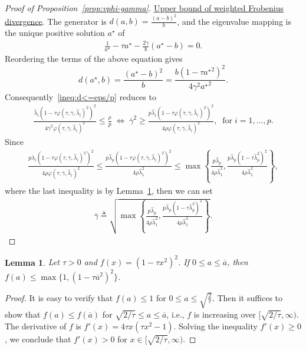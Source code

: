 \documentclass[11pt]{article}
\newtheorem{lemma}{Lemma}
\newcommand{\opt}{^\star}
\newcommand{\Let}{\triangleq}
\newcommand{\wh}{\widehat}
\begin{document}
\begin{proof}[Proof of Proposition~\ref{prop:vphi-gamma}]
    \underline{Upper bound of weighted Frobenius divergence}. The generator is $d(a,b)=\frac{(a-b)^2}{b}$, and the eigenvalue mapping is the unique positive solution $a\opt$ of 
    \begin{align*}
        \frac{1}{a\opt}-\tau a\opt - \frac{2\gamma}{b}(a\opt-b) = 0.
    \end{align*}
    Reordering the terms of the above equation gives
    \[
        d(a\opt,b)=\frac{(a\opt-b)^2}{b} = \frac{b(1-\tau {a\opt}^2)^2}{4\gamma^2{a\opt}^2}.
    \]
    Consequently~\eqref{ineq:d<=eps/p} reduces to
    \begin{align*}
        \frac{\wh\lambda_i(1-\tau \varphi(\tau,\overline{\gamma},\wh\lambda_i)^2)^2}{4\overline{\gamma}^2\varphi(\tau,\overline{\gamma},\wh\lambda_i)^2}
        \leq \frac{ \rho}{p}
        \;\Longleftrightarrow\;
        \overline{\gamma}^2\geq \frac{p\wh\lambda_i(1-\tau \varphi(\tau,\overline{\gamma},\wh\lambda_i)^2)^2}{4 \rho\varphi(\tau,\overline{\gamma},\wh\lambda_i)^2}
        ,\;\; \text{for}\; i=1,...,p.
    \end{align*}
    Since 
    \begin{align*}
        \frac{p\wh\lambda_i(1-\tau \varphi(\tau,\overline{\gamma},\wh\lambda_i)^2)^2}{4 \rho\varphi(\tau,\overline{\gamma},\wh\lambda_i)^2} \leq \frac{p\wh\lambda_p(1-\tau \varphi(\tau,\overline{\gamma},\wh\lambda_i)^2)^2}{4 \rho\wh\lambda_1^2} \leq \max\left\{\frac{p\wh\lambda_p}{4 \rho\wh\lambda_1^2},\frac{p\wh\lambda_p(1-\tau \wh\lambda_p^2)^2}{4 \rho\wh\lambda_1^2}\right\},
    \end{align*} where the last inequality is by Lemma~\ref{lemma:1-tau-phi}, then we can set
    \begin{align*}
        \overline{\gamma} \Let\sqrt{\max\left\{\frac{p\wh\lambda_p}{4 \rho\wh\lambda_1^2},\frac{p\wh\lambda_p(1-\tau \wh\lambda_p^2)^2}{4 \rho\wh\lambda_1^2}\right\}}.
    \end{align*}
\end{proof}

\begin{lemma}\label{lemma:1-tau-phi}
    Let $\tau>0$ and $f(x) = (1-\tau x^2)^2$. If $0 \leq a \leq \overline{a}$, then $f(a) \leq \max\{1, (1-\tau \overline{a}^2)^2\}$.
\end{lemma}
\begin{proof}
    It is easy to verify that $f(a) \leq 1$ for $0\leq a\leq \sqrt{\frac{2}{\tau}}$. Then it suffices to show that $f(a) \leq f(\overline{a})$ for $\sqrt{2/\tau}\leq a \leq \overline{a}$, i.e.,  
    $f$ is increasing over $[\sqrt{2/\tau}, \infty)$. The derivative of $f$ is $f'(x) = 4\tau x(\tau x^2-1)$. Solving the inequality $f'(x) \geq 0$, we conclude that $f'(x) > 0$ for $x\in[\sqrt{2/\tau}, \infty)$.
\end{proof}
\end{document}
